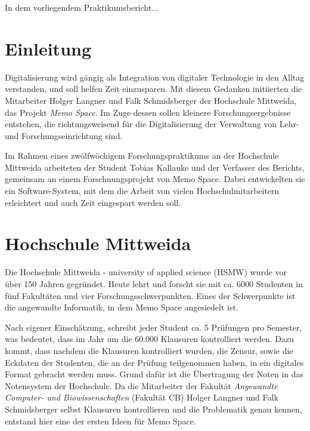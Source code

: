 \documentclass[nomenclature, oneside, 150]{HSMW-Thesis}
\begin{document}
\begin{Referat}
In dem vorliegendem Praktikumsbericht...

\end{Referat}


\Hauptteil


\chapter{Einleitung}
	Digitalisierung wird gängig als Integration von digitaler Technologie in den Alltag verstanden, und soll helfen Zeit einzusparen. Mit diesem Gedanken initiierten die Mitarbeiter Holger Langner und Falk Schmidsberger der Hochschule Mittweida, das Projekt \textit{Memo Space}. Im Zuge dessen sollen kleinere Forschungsergebnisse entstehen, die richtungsweisend für die Digitalisierung der Verwaltung von Lehr- und Forschungseinrichtung sind.

	Im Rahmen eines zwölfwöchigem Forschungspraktikums an der Hochschule Mittweida arbeiteten der Student Tobias Kallauke und der Verfasser des Berichts, gemeinsam an einem Forschnungsprojekt von Memo Space. Dabei entwickelten sie ein Software-System, mit dem die Arbeit von vielen Hochschulmitarbeitern erleichtert und auch Zeit eingespart werden soll.


\chapter{Hochschule Mittweida}
	Die Hochschule Mittweida - university of applied science (HSMW)  wurde vor über 150 Jahren gegründet. Heute lehrt und forscht sie mit ca. 6000 Studenten in fünf Fakultäten und vier Forschungsschwerpunkten\cite{noauthor_hochschule_nodate}. Eines der Schwerpunkte ist die angewandte Informatik, in dem Memo Space angesiedelt ist.
	
	Nach eigener Einschätzung, schreibt jeder Student ca. 5 Prüfungen pro Semester, was bedeutet, dass im Jahr um die 60.000 Klausuren kontrolliert werden. Dazu kommt, dass nachdem die Klausuren kontrolliert wurden, die Zensur, sowie die Eckdaten der Studenten, die an der Prüfung teilgenommen haben, in ein digitales Format gebracht werden muss. Grund dafür ist die Übertragung der Noten in das Notensystem der Hochschule. Da die Mitarbeiter der Fakultät \textit{Angewandte Computer- und Biowissenschaften} (Fakultät CB) Holger Langner und Falk Schmidsberger selbst Klausuren kontrollieren und die Problematik genau kennen, entstand hier eine der ersten Ideen für Memo Space.
\end{document}
